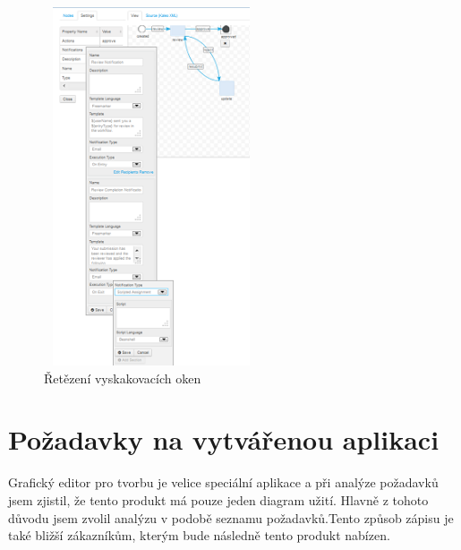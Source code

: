 \documentclass{fithesis}
\begin{document}
\begin{figure}[htp]
\centering
\includegraphics[width=240px, height=400px]{images/kaleo_designer_popup.png}
\caption{Řetězení vyskakovacích oken}
\label{fig:kaleo_designer_popup}
\end{figure}

\section{Požadavky na vytvářenou aplikaci}
Grafický editor pro tvorbu je velice speciální aplikace a při analýze požadavků jsem zjistil, že tento produkt má pouze jeden diagram užití. Hlavně z tohoto důvodu jsem zvolil analýzu v podobě seznamu požadavků.Tento způsob zápisu je také bližší zákazníkům, kterým bude následně tento produkt nabízen. 
\end{document}
